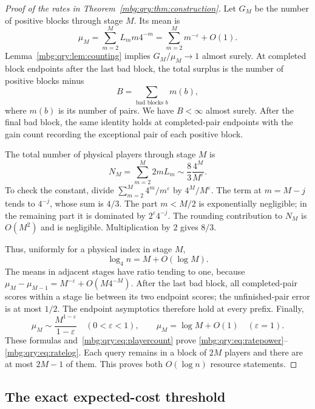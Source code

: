 \documentclass[11pt,letterpaper]{article}
\theoremstyle{definition}
\begin{document}
\begin{proof}[Proof of the rates in Theorem~\ref{mbg:qry:thm:construction}]
Let \(G_M\) be the number of positive blocks through stage \(M\).
Its mean is
\begin{equation}
 \mu_M=\sum_{m=2}^M L_m m4^{-m}
 =\sum_{m=2}^Mm^{-\varepsilon}+O(1).
 \label{mbg:qry:eq:gainmean}
\end{equation}
Lemma~\ref{mbg:qry:lem:counting} implies \(G_M/\mu_M\to1\) almost surely.
At completed block endpoints after the last bad block, the total
surplus is the number of positive blocks minus
\[
 B=\sum_{\text{bad blocks }b}m(b),
\]
where \(m(b)\) is its number of pairs. We have \(B<\infty\) almost
surely. After the final bad block, the same identity holds at
completed-pair endpoints with the gain count recording the exceptional
pair of each positive block.

The total number of physical players through stage \(M\) is
\begin{equation}
 N_M=\sum_{m=2}^M2mL_m
 \sim\frac83\frac{4^M}{M^\varepsilon}.
 \label{mbg:qry:eq:playercount}
\end{equation}
To check the constant, divide
\(\sum_{m=2}^M4^m/m^\varepsilon\) by \(4^M/M^\varepsilon\).
The term at \(m=M-j\) tends to \(4^{-j}\), whose sum is \(4/3\).
The part \(m<M/2\) is exponentially negligible; in the remaining
part it is dominated by \(2^\varepsilon4^{-j}\).
The rounding contribution to \(N_M\) is \(O(M^2)\) and is negligible.
Multiplication by \(2\) gives \(8/3\).

Thus, uniformly for a physical index in stage \(M\),
\[
 \log_4 n=M+O(\log M).
\]
The means in adjacent stages have ratio tending to one, because
\(\mu_M-\mu_{M-1}=M^{-\varepsilon}+O(M4^{-M})\).
After the last bad block, all completed-pair scores within a stage
lie between its two endpoint scores; the unfinished-pair error is
at most \(1/2\). The endpoint asymptotics therefore hold at every
prefix. Finally,
\[
 \mu_M\sim\frac{M^{1-\varepsilon}}{1-\varepsilon}
 \quad(0<\varepsilon<1),\qquad
 \mu_M=\log M+O(1)\quad(\varepsilon=1).
\]
These formulas and~\eqref{mbg:qry:eq:playercount} prove
\eqref{mbg:qry:eq:ratepower}--\eqref{mbg:qry:eq:ratelog}.
Each query remains in a block of \(2M\) players and there are at most
\(2M-1\) of them. This proves both \(O(\log n)\) resource statements.
\end{proof}

\subsection{The exact expected-cost threshold}
\end{document}
